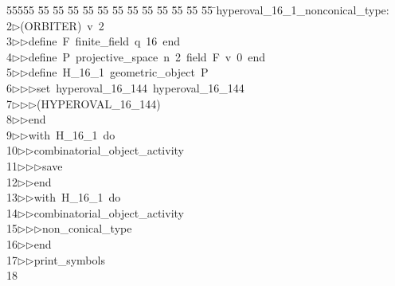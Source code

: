 %
%
\begin{tabbing}
55555 \= 55 \= 55 \= 55 \= 55 \= 55 \= 55 \= 55 \= 55 \= 55 \= 55 \= 55 \= 55 \= \>hyperoval\_16\_1\_nonconical\_type:\\[0pt]
2\>$\triangleright$\>(ORBITER)\ v\ 2\ \\[0pt]
3\>$\triangleright$\>$\triangleright$\>define\ F\ finite\_field\ q\ 16\ end\ \\[0pt]
4\>$\triangleright$\>$\triangleright$\>define\ P\ projective\_space\ n\ 2\ field\ F\ v\ 0\ end\ \\[0pt]
5\>$\triangleright$\>$\triangleright$\>define\ H\_16\_1\ geometric\_object\ P\ \\[0pt]
6\>$\triangleright$\>$\triangleright$\>$\triangleright$\>set\ hyperoval\_16\_144\ hyperoval\_16\_144\ \\[0pt]
7\>$\triangleright$\>$\triangleright$\>$\triangleright$\>(HYPEROVAL\_16\_144)\ \\[0pt]
8\>$\triangleright$\>$\triangleright$\>end\ \\[0pt]
9\>$\triangleright$\>$\triangleright$\>with\ H\_16\_1\ do\ \\[0pt]
10\>$\triangleright$\>$\triangleright$\>combinatorial\_object\_activity\ \\[0pt]
11\>$\triangleright$\>$\triangleright$\>$\triangleright$\>save\ \\[0pt]
12\>$\triangleright$\>$\triangleright$\>end\ \\[0pt]
13\>$\triangleright$\>$\triangleright$\>with\ H\_16\_1\ do\ \\[0pt]
14\>$\triangleright$\>$\triangleright$\>combinatorial\_object\_activity\ \\[0pt]
15\>$\triangleright$\>$\triangleright$\>$\triangleright$\>non\_conical\_type\ \\[0pt]
16\>$\triangleright$\>$\triangleright$\>end\ \\[0pt]
17\>$\triangleright$\>$\triangleright$\>print\_symbols\\[0pt]
18\>\end{tabbing}
